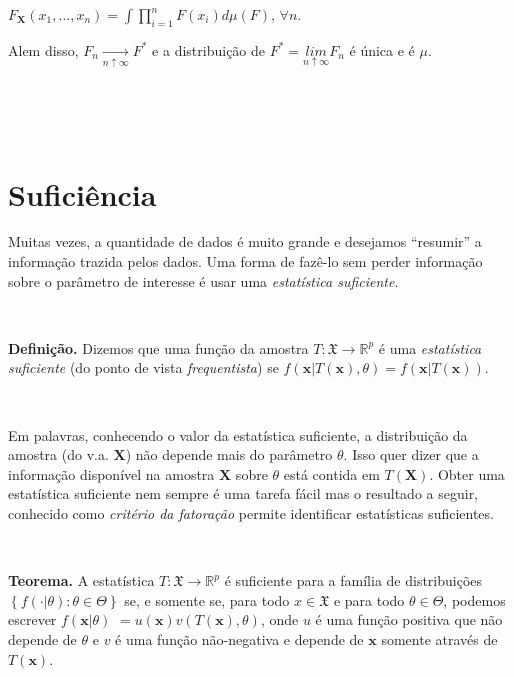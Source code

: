 \documentclass[
]{book}
\begin{document}
\(F_{\mathbf X}(x_1,\ldots,x_n)=\int\prod_{i=1}^n F(x_i)d\mu(F)\), \(\forall n\).

Alem disso, \(F_n\underset{n\uparrow\infty}{\longrightarrow}F^*\) e a distribuição de \(F^*=\underset{n\uparrow\infty}{lim}F_n\) é única e é \(\mu\).

\(~\)

\(~\)

\hypertarget{suficiuxeancia}{%
\section{Suficiência}\label{suficiuxeancia}}

Muitas vezes, a quantidade de dados é muito grande e desejamos ``resumir'' a informação trazida pelos dados. Uma forma de fazê-lo sem perder informação sobre o parâmetro de interesse é usar uma \emph{estatística suficiente}.

\(~\)

\textbf{Definição.} Dizemos que uma função da amostra \(T:\mathfrak{X} \rightarrow \mathbb{R}^p\) é uma \emph{estatística suficiente} (do ponto de vista \emph{frequentista}) se \(f\left(\boldsymbol x | T(\boldsymbol x),\theta\right) = f\left(\boldsymbol x | T(\boldsymbol x)\right)\).

\(~\)

Em palavras, conhecendo o valor da estatística suficiente, a distribuição da amostra (do v.a. \(\boldsymbol X\)) não depende mais do parâmetro \(\theta\). Isso quer dizer que a informação disponível na amostra \(\boldsymbol X\) sobre \(\theta\) está contida em \(T(\boldsymbol X)\). Obter uma estatística suficiente nem sempre é uma tarefa fácil mas o resultado a seguir, conhecido como \emph{critério da fatoração} permite identificar estatísticas suficientes.

\(~\)

\textbf{Teorema.} A estatística \(T:\mathfrak{X} \rightarrow \mathbb{R}^p\) é suficiente para a família de distribuições \(\left\{f(\cdot|\theta):\theta \in \Theta\right\}\) se, e somente se, para todo \(x \in \mathfrak{X}\) e para todo \(\theta \in \Theta\), podemos escrever \(f\left(\boldsymbol x | \theta\right)\) \(= u(\boldsymbol x) v\left(T(\boldsymbol x),\theta\right)\), onde \(u\) é uma função positiva que não depende de \(\theta\) e \(v\) é uma função não-negativa e depende de \(\boldsymbol x\) somente através de \(T(\boldsymbol x)\).

\(~\)
\end{document}
